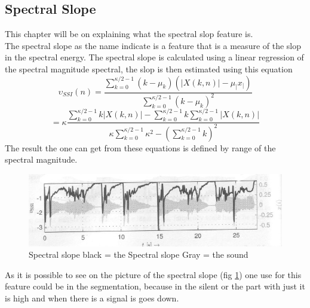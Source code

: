 \subsection{Spectral Slope}
This chapter will be on explaining what the spectral slop feature is.\\
The spectral slope as the name indicate is a feature that is a measure of the slop in the spectral energy\citep{ACA}. The spectral slope is calculated using a linear regression of the spectral magnitude spectral, the slop is then estimated using this equation\citep{ACA}
\begin{equation}
	\upsilon _{SSI} (n) = \frac{\displaystyle\sum_{k = 0}^{\kappa/2-1}(k - \mu_k)(\vert X(k,n)\vert - \mu_\vert x _\vert)}{\displaystyle\sum_{k = 0}^{\kappa/2-1}(k - \mu_k)^2}
\end{equation}
\begin{equation}
	= \kappa\frac{\displaystyle\sum_{k= 0}^{\kappa/2-1}k\vert X(k,n)\vert - \displaystyle\sum_{k = 0}^{\kappa/2-1}k\displaystyle\sum_{k = 0}^{\kappa/2-1}\vert X(k,n)\vert}{\kappa \displaystyle\sum_{k = 0}^{\kappa/2-1}\kappa^2-(\displaystyle\sum_{k = 0}^{\kappa/2-1}k)^2}
\end{equation}
The result the one can get from these equations is defined by range of the spectral magnitude.
\begin{figure}[h]
	\begin{center}
		\includegraphics[scale = 0.5]{fig/spectral_slope_fig.jpg}
		\caption{Spectral slope black = the Spectral slope Gray = the sound \citep{ACA}}
		\label{Spectral slope pic}
	\end{center}
\end{figure}
As it is possible to see on the picture of the spectral slope (fig \ref{Spectral slope pic}) one use for this feature could be in the segmentation, because in the silent or the part with just it is high and when there is a signal is goes down. 
